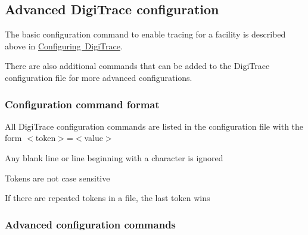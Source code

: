  \hypertarget{a00834_digitrace__advancedconfiguration}{}\subsection{Advanced Digi\+Trace configuration}\label{a00834_digitrace__advancedconfiguration}
 The basic configuration command to enable tracing for a facility is described above in \mbox{\hyperlink{a00834_digitrace__configuring}{Configuring Digi\+Trace}}.

 There are also additional commands that can be added to the Digi\+Trace configuration file for more advanced configurations.

\hypertarget{a00834_digitrace__advancedconfiguration__commandformat}{}\subsubsection{Configuration command format}\label{a00834_digitrace__advancedconfiguration__commandformat}
 
\begin{DoxyItemize}
\item All Digi\+Trace configuration commands are listed in the configuration file with the form $<$token$>$=$<$value$>$  
\item Any blank line or line beginning with a \textquotesingle{}{\ttfamily \#}\textquotesingle{} character is ignored  
\item Tokens are not case sensitive  
\item If there are repeated tokens in a file, the last token wins  
\end{DoxyItemize}

\hypertarget{a00834_digitrace__advancedconfiguration__commands}{}\subsubsection{Advanced configuration commands}\label{a00834_digitrace__advancedconfiguration__commands}
 

